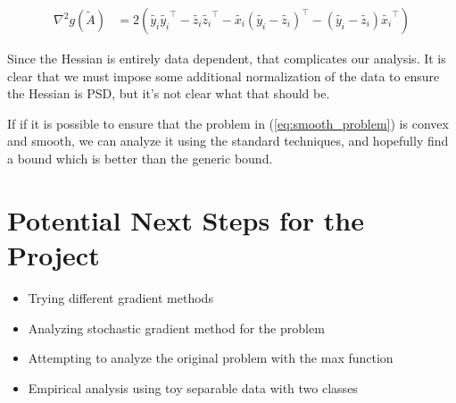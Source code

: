 \documentclass[11pt]{article}
\begin{document}
\begin{equation}
\begin{aligned}
\nabla^2 g(\tilde{A})
&= 2(\tilde{y_i}\tilde{y_i}^\top - \tilde{z_i}\tilde{z_i}^\top - \tilde{x_i}(\tilde{y_i} - \tilde{z_i})^\top - (\tilde{y_i} - \tilde{z_i})\tilde{x_i}^\top)
\end{aligned}
\end{equation}

Since the Hessian is entirely data dependent, that complicates our analysis. It is clear that we must impose some additional normalization of the data to ensure the Hessian is PSD, but it's not clear what that should be.

If if it is possible to ensure that the problem in (\ref{eq:smooth_problem}) is convex and smooth, we can analyze it using the standard techniques, and hopefully find a bound which is better than the generic bound.

\section{Potential Next Steps for the Project}

\begin{itemize}
  \item Trying different gradient methods
  \item Analyzing stochastic gradient method for the problem
  \item Attempting to analyze the original problem with the max function
  \item Empirical analysis using toy separable data with two classes
\end{itemize}
\end{document}
